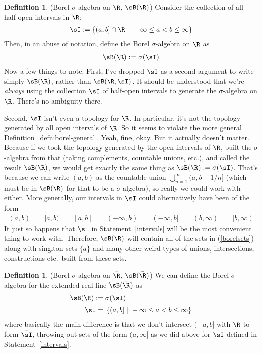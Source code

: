 \documentclass[12pt]{article}
\theoremstyle{plain}
\theoremstyle{definition}
\newtheorem{defn}[thm]{Definition}
\theoremstyle{remark}
\newcommand{\ninf}{_{n=1}^\infty}
\begin{document}
\begin{defn}(Borel $\sigma$-algebra on $\R$, $\sB(\R)$)
Consider the collection of all half-open intervals in $\R$:
\begin{align}
  \sI := \left\{(a,b] \cap \R \; | \; -\infty\leq a < b \leq \infty\right\}
  \label{intervals}
\end{align}
Then, in an abuse of notation, define the Borel $\sigma$-algebra on $\R$
as
\begin{align*}
  \sB(\R) := \sigma(\sI)
\end{align*}
Now a few things to note. First, I've dropped $\sI$ as a second argument
to write simply $\sB(\R)$, rather than $\sB(\R,\sI)$. It should be
understood that we're \emph{always} using the collection $\sI$ of
half-open intervals to generate the $\sigma$-algebra on $\R$. There's no
ambiguity there.

Second, $\sI$ isn't even a topology for $\R$. In particular, it's not
the topology generated by all open intervals of $\R$. So it seems to
violate the more general Definition~\ref{defn:borel-general}.
Yeah, fine, okay. But it actually doesn't matter. Because if we
took the topology generated by the open intervals of $\R$, built the
$\sigma$-algebra from that (taking complements, countable unions,
etc.), and called the result $\sB(\R)$, we would get exactly the same
thing as $\sB(\R):=\sigma(\sI)$. That's because we can write $(a,b)$ as
the countable union $\bigcup\ninf(a,b-1/n]$ (which must be in $\sB(\R)$
for that to be a $\sigma$-algebra), so really we could work with either.
More generally, our intervals in $\sI$ could alternatively have been of
the form
\begin{align}
  (a,b)
  \qquad
  [a,b)
  \qquad
  [a,b]
  \qquad
  (-\infty,b)
  \qquad
  (-\infty,b]
  \qquad
  (b,\infty)
  \qquad
  [b,\infty)
  \label{borelsets}
\end{align}
It just so happens that $\sI$ in Statement~\ref{intervals} will be the
most convenient thing to work with.
Therefore, $\sB(\R)$ will contain all of the sets in (\ref{borelsets})
along with singlton sets $\{a\}$ and many other weird types of unions,
intersections, constructions etc.\ built from these sets.
\end{defn}

\begin{defn}(Borel $\sigma$-algebra on $\bar{\R}$, $\sB(\bar{\R})$)
We can define the Borel $\sigma$-algebra for the extended real line
$\sB(\bar{\R})$ as
\begin{align*}
  \sB(\bar{\R}) :=& \; \sigma(\bar{\sI}) \\
  \bar{\sI} =& \; \left\{(a,b] \; | \; -\infty\leq a < b \leq \infty\right\}
\end{align*}
where basically the main difference is that we don't intersect
$(-a,b]$ with $\R$ to form $\bar{\sI}$, throwing out sets of the form
$(a,\infty]$ as we did above for $\sI$ defined in
Statement~\ref{intervals}.
\end{defn}
\end{document}
